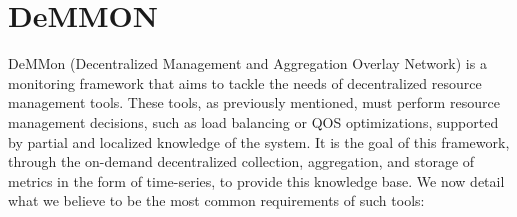 

\chapter{DeMMON}
\label{cha:demmon} 

DeMMon (Decentralized Management and Aggregation Overlay Network) is a monitoring framework that aims to tackle the needs of decentralized resource management tools. These tools, as previously mentioned, must perform resource management decisions, such as load balancing or QOS optimizations, supported by partial and localized knowledge of the system. It is the goal of this framework, through the on-demand decentralized collection, aggregation, and storage of metrics in the form of time-series, to provide this knowledge base. We now detail what we believe to be the most common requirements of such tools:

